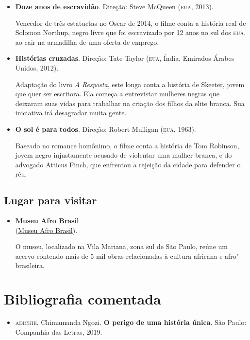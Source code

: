 \documentclass[11pt]{extarticle}
\begin{document}
\begin{enumerate}
\begin{enumerate}
\begin{enumerate}
\begin{itemize}
\item\textbf{Doze anos de escravidão}. Direção: Steve McQueen (\textsc{eua}, 2013).

Vencedor de três estatuetas no Oscar de 2014, o filme conta a história
real de Solomon Northup, negro livre que foi escravizado por 12 anos no
sul dos \textsc{eua}, ao cair na armadilha de uma oferta de emprego.

\item\textbf{Histórias cruzadas}. Direção: Tate Taylor (\textsc{eua}, Índia,
  Emirados Árabes Unidos, 2012).

Adaptação do livro \emph{A Resposta}, este longa conta a história de
Skeeter, jovem que quer ser escritora. Ela começa a entrevistar mulheres
negras que deixaram suas vidas para trabalhar na criação dos filhos da
elite branca. Sua iniciativa irá desagradar muita gente.

\item\textbf{O sol é para todos}. Direção: Robert Mulligan (\textsc{eua}, 1963).

Baseado no romance homônimo, o filme conta a história de Tom Robinson,
jovem negro injustamente acusado de violentar uma mulher branca, e do
advogado Atticus Finch, que enfrentou a rejeição da cidade para defender
o réu.
\end{itemize}

\subsection{Lugar para visitar}

\begin{itemize}
\item\textbf{Museu Afro Brasil}\\
(\href{http://www.museuafrobrasil.org.br/}{Museu Afro Brasil}).

O museu, localizado na Vila Mariana, zona sul de São Paulo, reúne um
acervo contendo mais de 5 mil obras relacionadas à cultura africana e
afro"-brasileira.
\end{itemize}

\section{Bibliografia comentada}

\begin{itemize}
\item\textsc{adichie}, Chimamanda Ngozi. \textbf{O perigo de uma história única}.
  São Paulo: Companhia das Letras, 2019.


\end{itemize}
\end{enumerate}
\end{enumerate}
\end{enumerate}
\end{document}
